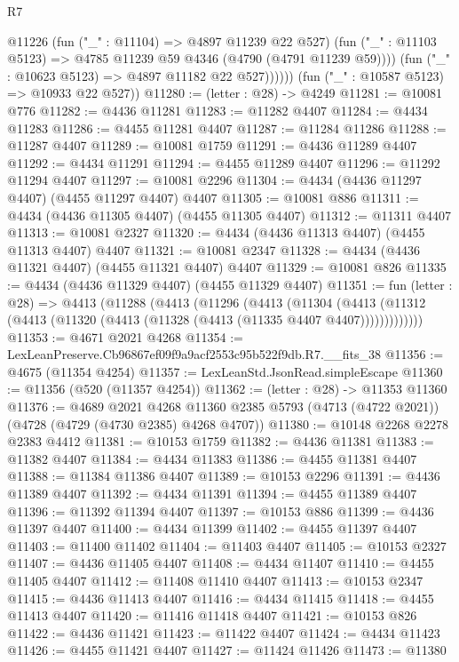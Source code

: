 \begin{lexlean}{R7}
\begin{coremodule}
                @11226
                  (fun ("_" : @11104) => @4897 @11239 @22 @527)
                  (fun ("_" : @11103 @5123) => @4785 @11239 @59 @4346 (@4790 (@4791 @11239 @59))))
                (fun ("_" : @10623 @5123) => @4897 @11182 @22 @527))))))
      (fun ("_" : @10587 @5123) => @10933 @22 @527))
@11280 := (letter : @28) -> @4249
@11281 := @10081 @776
@11282 := @4436 @11281
@11283 := @11282 @4407
@11284 := @4434 @11283
@11286 := @4455 @11281 @4407
@11287 := @11284 @11286
@11288 := @11287 @4407
@11289 := @10081 @1759
@11291 := @4436 @11289 @4407
@11292 := @4434 @11291
@11294 := @4455 @11289 @4407
@11296 := @11292 @11294 @4407
@11297 := @10081 @2296
@11304 := @4434 (@4436 @11297 @4407) (@4455 @11297 @4407) @4407
@11305 := @10081 @886
@11311 := @4434 (@4436 @11305 @4407) (@4455 @11305 @4407)
@11312 := @11311 @4407
@11313 := @10081 @2327
@11320 := @4434 (@4436 @11313 @4407) (@4455 @11313 @4407) @4407
@11321 := @10081 @2347
@11328 := @4434 (@4436 @11321 @4407) (@4455 @11321 @4407) @4407
@11329 := @10081 @826
@11335 := @4434 (@4436 @11329 @4407) (@4455 @11329 @4407)
@11351 := fun (letter : @28) =>
  @4413
    (@11288
      (@4413
        (@11296
          (@4413
            (@11304
              (@4413 (@11312 (@4413 (@11320 (@4413 (@11328 (@4413 (@11335 @4407 @4407)))))))))))))
@11353 := @4671 @2021 @4268
@11354 := LexLeanPreserve.Cb96867ef09f9a9acf2553c95b522f9db.R7.__fits_38
@11356 := @4675 (@11354 @4254)
@11357 := LexLeanStd.JsonRead.simpleEscape
@11360 := @11356 (@520 (@11357 @4254))
@11362 := (letter : @28) -> @11353 @11360
@11376 := @4689
    @2021
    @4268
    @11360
    @2385
    @5793
    (@4713 (@4722 @2021))
    (@4728 (@4729 (@4730 @2385) @4268 @4707))
@11380 := @10148 @2268 @2278 @2383 @4412
@11381 := @10153 @1759
@11382 := @4436 @11381
@11383 := @11382 @4407
@11384 := @4434 @11383
@11386 := @4455 @11381 @4407
@11388 := @11384 @11386 @4407
@11389 := @10153 @2296
@11391 := @4436 @11389 @4407
@11392 := @4434 @11391
@11394 := @4455 @11389 @4407
@11396 := @11392 @11394 @4407
@11397 := @10153 @886
@11399 := @4436 @11397 @4407
@11400 := @4434 @11399
@11402 := @4455 @11397 @4407
@11403 := @11400 @11402
@11404 := @11403 @4407
@11405 := @10153 @2327
@11407 := @4436 @11405 @4407
@11408 := @4434 @11407
@11410 := @4455 @11405 @4407
@11412 := @11408 @11410 @4407
@11413 := @10153 @2347
@11415 := @4436 @11413 @4407
@11416 := @4434 @11415
@11418 := @4455 @11413 @4407
@11420 := @11416 @11418 @4407
@11421 := @10153 @826
@11422 := @4436 @11421
@11423 := @11422 @4407
@11424 := @4434 @11423
@11426 := @4455 @11421 @4407
@11427 := @11424 @11426
@11473 := @11380

\end{coremodule}
\end{lexlean}

